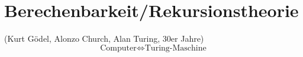 \section{Berechenbarkeit/Rekursionstheorie}
(Kurt Gödel, Alonzo Church, Alan Turing, 30er Jahre)
\begin{equation*}
	\mbox{Computer} \Leftrightarrow \mbox{Turing-Maschine}
\end{equation*}


